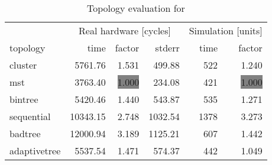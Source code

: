 \begin{table}[htb]
  \centering
  \begin{tabular}{lrrrrr}
  \toprule
  & \multicolumn{3}{c}{Real hardware [cycles]} & \multicolumn{2}{c}{Simulation [units]} \\
  topology & time & factor & stderr & time & factor \\
  \midrule
  cluster & 5761.76 & 1.531 & 499.88 & 522 & 1.240 \\
  mst & 3763.40 & \colorbox{gray}{1.000} & 234.08 & 421 & \colorbox{gray}{1.000} \\
  bintree & 5420.46 & 1.440 & 543.87 & 535 & 1.271 \\
  sequential & 10343.15 & 2.748 & 1032.54 & 1378 & 3.273 \\
  badtree & 12000.94 & 3.189 & 1125.21 & 607 & 1.442 \\
  adaptivetree & 5537.54 & 1.471 & 574.37 & 442 & 1.049 \\
  \midrule
  \end{tabular}
  \caption{Topology evaluation for \appenzeller}
  \label{tab:appenzeller}
\end{table}
